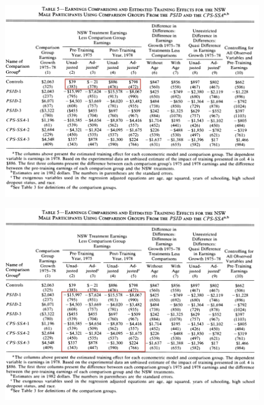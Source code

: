 \documentclass[notes=show]{beamer}
\begin{document}
\begin{frame}[plain]
	\begin{figure}
	\includegraphics[scale=0.8]{./lecture_includes/lalonde_table5a.png}
	\end{figure}

\end{frame}
\begin{frame}[plain]
	\begin{figure}
	\includegraphics[scale=0.8]{./lecture_includes/lalonde_table5b.png}
	\end{figure}

\end{frame}
\end{document}
